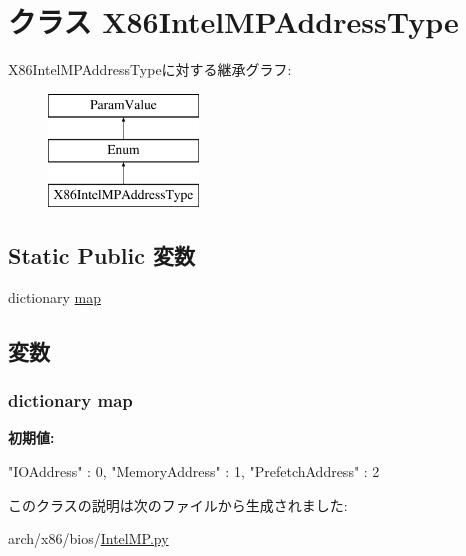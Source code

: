 \hypertarget{classIntelMP_1_1X86IntelMPAddressType}{
\section{クラス X86IntelMPAddressType}
\label{classIntelMP_1_1X86IntelMPAddressType}
}
X86IntelMPAddressTypeに対する継承グラフ:\begin{figure}[H]
\begin{center}
\leavevmode
\includegraphics[height=3cm]{classIntelMP_1_1X86IntelMPAddressType}
\end{center}
\end{figure}
\subsection*{Static Public 変数}
\begin{DoxyCompactItemize}
\item 
dictionary \hyperlink{classIntelMP_1_1X86IntelMPAddressType_aca70ca58dda85cf4fe7a0737ec18e004}{map}
\end{DoxyCompactItemize}


\subsection{変数}
\hypertarget{classIntelMP_1_1X86IntelMPAddressType_aca70ca58dda85cf4fe7a0737ec18e004}{
\subsubsection[{map}]{\setlength{\rightskip}{0pt plus 5cm}dictionary {\bf map}}}
\label{classIntelMP_1_1X86IntelMPAddressType_aca70ca58dda85cf4fe7a0737ec18e004}
{\bfseries 初期値:}
\begin{DoxyCode}
{"IOAddress" : 0,
           "MemoryAddress" : 1,
           "PrefetchAddress" : 2
    }
\end{DoxyCode}


このクラスの説明は次のファイルから生成されました:\begin{DoxyCompactItemize}
\item 
arch/x86/bios/\hyperlink{IntelMP_8py}{IntelMP.py}\end{DoxyCompactItemize}
